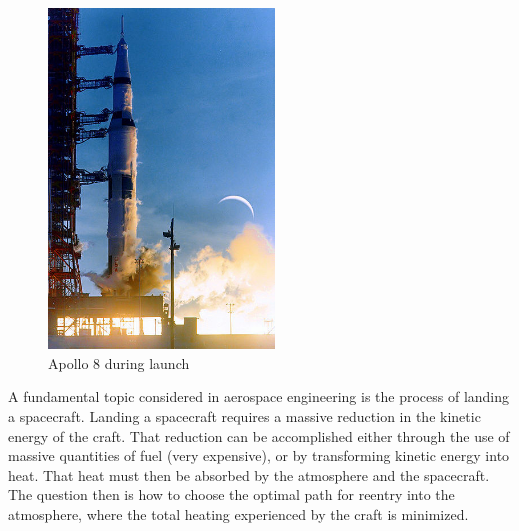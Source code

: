\label{lab:reentry}

\begin{figure}
\centering
\includegraphics[width=6cm]{Apollo8_during_Launch.jpg}
\caption{Apollo 8 during launch}
\label{fig:reentry:apollo8}
\end{figure}

A fundamental topic considered in aerospace engineering is the process of landing a spacecraft. 
Landing a spacecraft requires a massive reduction in the kinetic energy of the craft. 
That reduction can be accomplished either through the use of massive quantities of fuel (very expensive), or by  transforming kinetic energy into heat. 
That heat must then be absorbed by the atmosphere and the spacecraft. 
The question then is how to choose the optimal path for reentry into the atmosphere, where the total heating experienced by the craft is minimized. 


